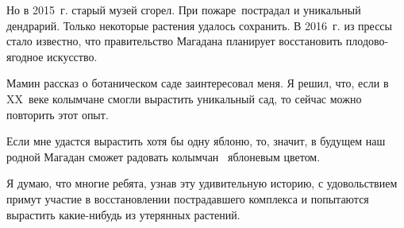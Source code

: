 Но в 2015~г. старый музей сгорел. При пожаре пострадал и уникальный дендрарий. Только некоторые растения удалось сохранить.
В 2016~г. из прессы стало известно, что правительство Магадана планирует восстановить плодово-ягодное искусство.

Мамин рассказ о ботаническом саде заинтересовал меня. Я решил, что, если в XX~веке колымчане смогли вырастить уникальный сад, то сейчас можно повторить этот опыт.

Если мне удастся вырастить хотя бы одну яблоню, то, значит, в будущем наш родной Магадан сможет радовать колымчан  яблоневым цветом.

Я думаю, что многие ребята, узнав эту удивительную историю, с удовольствием примут участие в восстановлении пострадавшего комплекса и попытаются вырастить какие-нибудь из утерянных растений.
